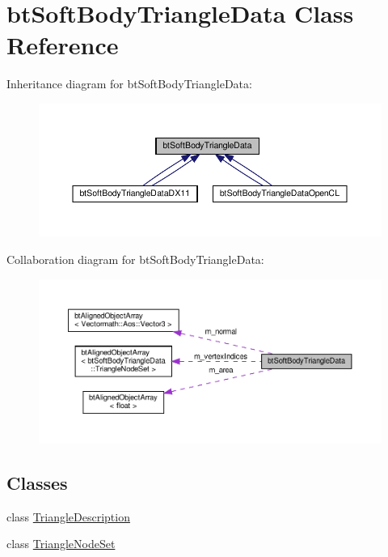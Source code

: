 \hypertarget{classbtSoftBodyTriangleData}{}\section{bt\+Soft\+Body\+Triangle\+Data Class Reference}
\label{classbtSoftBodyTriangleData}


Inheritance diagram for bt\+Soft\+Body\+Triangle\+Data\+:
\nopagebreak
\begin{figure}[H]
\begin{center}
\leavevmode
\includegraphics[width=350pt]{classbtSoftBodyTriangleData__inherit__graph}
\end{center}
\end{figure}


Collaboration diagram for bt\+Soft\+Body\+Triangle\+Data\+:
\nopagebreak
\begin{figure}[H]
\begin{center}
\leavevmode
\includegraphics[width=350pt]{classbtSoftBodyTriangleData__coll__graph}
\end{center}
\end{figure}
\subsection*{Classes}
\begin{DoxyCompactItemize}
\item 
class \hyperlink{classbtSoftBodyTriangleData_1_1TriangleDescription}{Triangle\+Description}
\item 
class \hyperlink{classbtSoftBodyTriangleData_1_1TriangleNodeSet}{Triangle\+Node\+Set}
\end{DoxyCompactItemize}
